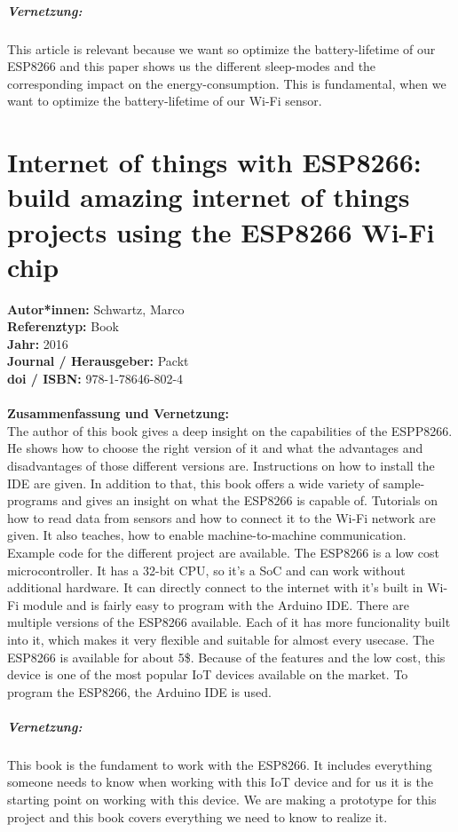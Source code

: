 \documentclass{report}
\begin{document}
\paragraph{Vernetzung:}
This article is relevant because we want so optimize the battery-lifetime of our ESP8266 and this paper shows us the different sleep-modes and the corresponding impact on the energy-consumption. This is fundamental, when we want to optimize the battery-lifetime of our Wi-Fi sensor.


{\let\clearpage\relax \chapter{Internet of things with ESP8266: build amazing internet of things projects using the ESP8266 Wi-Fi chip}}
\noindent
\textbf{Autor*innen:} Schwartz,
Marco\\
\textbf{Referenztyp:} Book\\
\textbf{Jahr:} 2016\\
\textbf{Journal / Herausgeber:} Packt\\
\textbf{doi / ISBN:} 978-1-78646-802-4\\\\
\textbf{Zusammenfassung und Vernetzung:}\\
The author of this book gives a deep insight on the capabilities of the ESPP8266. He shows how to choose the right version of it and what the advantages and disadvantages of those different versions are. Instructions on how to install the IDE are given. In addition to that, this book offers a wide variety of sample-programs and gives an insight on what the ESP8266 is capable of. Tutorials on how to read data from sensors and how to connect it to the Wi-Fi network are given. It also teaches, how to enable machine-to-machine communication. Example code for the different project are available. The ESP8266 is a low cost microcontroller. It has a 32-bit CPU, so it's a SoC and can work without additional hardware. It can directly connect to the internet with it's built in Wi-Fi module and is fairly easy to program with the Arduino IDE. There are multiple versions of the ESP8266 available. Each of it has more funcionality built into it, which makes it very flexible and suitable for almost every usecase. The ESP8266 is available for about 5\$. Because of the features and the low cost, this device is one of the most popular IoT devices available on the market. To program the ESP8266, the Arduino IDE is used.\\
\paragraph{Vernetzung:} This book is the fundament to work with the ESP8266. It includes everything someone needs to know when working with this IoT device and for us it is the starting point on working with this device. We are making a prototype for this project and this book covers everything we need to know to realize it.
\end{document}
